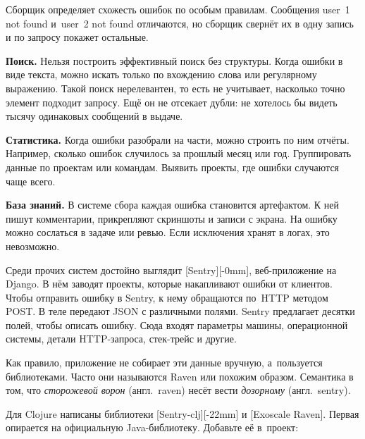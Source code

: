 Сборщик определяет схожесть ошибок по особым правилам. Сообщения user~1 not
found и~user~2 not found отличаются, но сборщик свернёт их в одну
запись и по запросу покажет остальные.

\textbf{Поиск.} Нельзя построить эффективный поиск без структуры. Когда ошибки в
виде текста, можно искать только по вхождению слова или регулярному
выражению. Такой поиск нерелевантен, то есть не учитывает, насколько точно
элемент подходит запросу. Ещё он не отсекает дубли: не хотелось бы видеть тысячу
одинаковых сообщений в выдаче.

\textbf{Статистика.} Когда ошибки разобрали на части, можно строить по ним
отчёты. Например, сколько ошибок случилось за прошлый месяц или
год. Группировать данные по проектам или командам. Выявить проекты, где ошибки
случаются чаще всего.

\textbf{База знаний.} В системе сбора каждая ошибка становится артефактом. К ней
пишут комментарии, прикрепляют скриншоты и записи с экрана. На ошибку можно
сослаться в задаче или ревью. Если исключения хранят в логах, это невозможно.


Среди прочих систем достойно выглядит [Sentry][-0mm],
веб-приложение на Django. В нём заводят проекты, которые накапливают ошибки
от клиентов. Чтобы отправить ошибку в Sentry, к нему обращаются по~HTTP методом
POST. В теле передают JSON с различными полями. Sentry предлагает десятки полей,
чтобы описать ошибку. Сюда входят параметры машины, операционной системы, детали
HTTP-запроса, стек-трейс и другие.


Как правило, приложение не собирает эти данные вручную, а~пользуется
библиотеками. Часто они называются Raven или похожим образом. Семантика в том,
что \emph{сторожевой ворон} (англ.~raven) несёт вести \emph{дозорному}
(англ.~sentry).

Для Clojure написаны библиотеки [Sentry-clj][-22mm] и
[Exoscale Raven]. Первая опирается на
официальную Java-библиотеку. Добавьте её в~проект:

\begin{english}
  \begin{clojure}
  \end{clojure}
\end{english}

